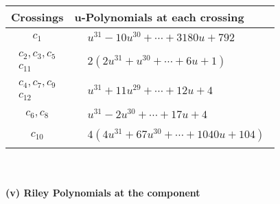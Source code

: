 \documentclass[1p]{elsarticle_modified}
\theoremstyle{definition}
\begin{document}
\begin{tabular}{m{50pt}|m{274pt}}
Crossings & \hspace{64pt}u-Polynomials at each crossing \\
\hline $$\begin{aligned}c_{1}\end{aligned}$$&$\begin{aligned}
&u^{31}-10 u^{30}+\cdots+3180 u+792
\end{aligned}$\\
\hline $$\begin{aligned}c_{2},c_{3},c_{5}\\c_{11}\end{aligned}$$&$\begin{aligned}
&2(2 u^{31}+u^{30}+\cdots+6 u+1)
\end{aligned}$\\
\hline $$\begin{aligned}c_{4},c_{7},c_{9}\\c_{12}\end{aligned}$$&$\begin{aligned}
&u^{31}+11 u^{29}+\cdots+12 u+4
\end{aligned}$\\
\hline $$\begin{aligned}c_{6},c_{8}\end{aligned}$$&$\begin{aligned}
&u^{31}-2 u^{30}+\cdots+17 u+4
\end{aligned}$\\
\hline $$\begin{aligned}c_{10}\end{aligned}$$&$\begin{aligned}
&4(4 u^{31}+67 u^{30}+\cdots+1040 u+104)
\end{aligned}$\\
\hline
\end{tabular}\\~\\
\newpage\renewcommand{\arraystretch}{1}
\flushleft \textbf{(v) Riley Polynomials at the component}\newline \\
\end{document}
